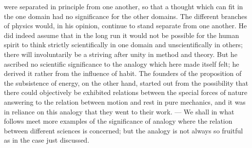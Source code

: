 \documentclass[12pt]{book}
\newcommand{\opage}[1]{\marginnote{\footnotesize\textit{[#1]}}}
\begin{document}
were separated in principle from one another, so that a thought which can fit in
the one domain had no significance for the other domains. The different branches
of physics would, in his opinion, continue to stand separate from one another. He
did indeed assume that in the long run it would not be possible for the human
spirit to think strictly scientifically in one domain and unscientifically in
others; there will involuntarily be a striving after unity in method and theory.
But he ascribed no scientific significance to the analogy which here made itself
felt; he derived it rather from the influence of habit. The founders of the
proposition of the subsistence of energy, on the other hand, started out from the
possibility that there could objectively be exhibited relations between \opage{77}the
special forces of nature answering to the relation between motion and rest in
pure mechanics, and it was in reliance on this analogy that they went to their
work. --- We shall in what follows meet more examples of the significance of
analogy where the relation between different sciences is concerned; but the
analogy is not always so fruitful as in the case just discussed.
\end{document}
